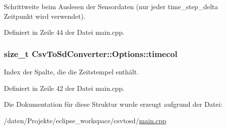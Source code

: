 Schrittweite beim Auslesen der Sensordaten (nur jeder time\-\_\-step\-\_\-delta Zeitpunkt wird verwendet). 



Definiert in Zeile 44 der Datei main.\-cpp.

\hypertarget{structCsvToSdConverter_1_1Options_a04caa5f640699fc38e1affe099c6d5eb}{
\subsubsection[{timecol}]{\setlength{\rightskip}{0pt plus 5cm}size\-\_\-t Csv\-To\-Sd\-Converter\-::\-Options\-::timecol}}\label{structCsvToSdConverter_1_1Options_a04caa5f640699fc38e1affe099c6d5eb}


Index der Spalte, die die Zeitstempel enthält. 



Definiert in Zeile 42 der Datei main.\-cpp.



Die Dokumentation für diese Struktur wurde erzeugt aufgrund der Datei\-:\begin{DoxyCompactItemize}
\item 
/daten/\-Projekte/eclipse\-\_\-workspace/csvtosd/\hyperlink{csvtosd_2main_8cpp}{main.\-cpp}\end{DoxyCompactItemize}
